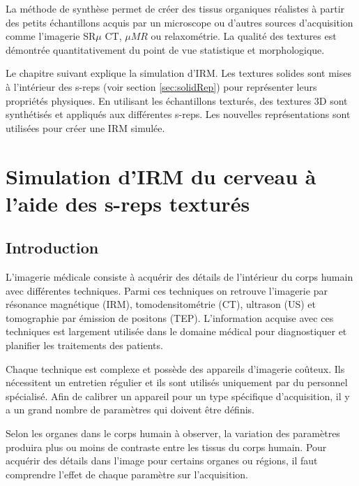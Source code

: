 La méthode de synthèse permet de créer des tissus organiques réalistes à partir des petits échantillons 
acquis par un microscope ou d'autres sources d'acquisition comme l'imagerie SR$\mu$ CT, $\mu MR$ ou relaxométrie.
La qualité des textures est démontrée quantitativement du point de vue statistique et morphologique.

Le chapitre suivant explique la simulation d'IRM.
Les textures solides sont mises à l'intérieur des s-reps (voir section \ref{sec:solidRep}) pour représenter leurs propriétés physiques.
En utilisant les échantillons texturés, des textures 3D sont synthétisés et appliqués aux différentes s-reps.
Les nouvelles représentations sont utilisées pour créer une IRM simulée.


\section{Simulation d'IRM du cerveau à l'aide des s-reps texturés}
\label{sec:MRISimulationfr}

\subsection{Introduction}

L'imagerie médicale consiste à acquérir des détails de l'intérieur du corps humain avec différentes techniques.
Parmi ces techniques on retrouve l'imagerie par résonance magnétique (IRM), tomodensitométrie (CT),
ultrason (US) et tomographie par émission de positons (TEP).
L'information acquise avec ces techniques est largement 
utilisée dans le domaine médical pour diagnostiquer et planifier les traitements des patients.

Chaque technique est complexe et possède des appareils d'imagerie coûteux.
Ils nécessitent un entretien régulier et ils sont utilisés uniquement par du personnel spécialisé.
Afin de calibrer un appareil pour un type spécifique d'acquisition, il y a un grand nombre de paramètres qui doivent être définis.

Selon les organes dans le corps humain à observer, la variation 
des paramètres produira plus ou moins de contraste entre les tissus du corps humain.
Pour acquérir des détails dans l'image pour certains organes ou régions, il faut comprendre l'effet de chaque paramètre sur l'acquisition.

